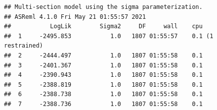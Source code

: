 \documentclass[
  12pt,
]{book}
\newenvironment{Shaded}{\begin{snugshade}}{\end{snugshade}}
\newcommand{\AttributeTok}[1]{\textcolor[rgb]{0.77,0.63,0.00}{#1}}
\newcommand{\DecValTok}[1]{\textcolor[rgb]{0.00,0.00,0.81}{#1}}
\newcommand{\FloatTok}[1]{\textcolor[rgb]{0.00,0.00,0.81}{#1}}
\newcommand{\FunctionTok}[1]{\textcolor[rgb]{0.00,0.00,0.00}{#1}}
\newcommand{\NormalTok}[1]{#1}
\newcommand{\OtherTok}[1]{\textcolor[rgb]{0.56,0.35,0.01}{#1}}
\newcommand{\SpecialCharTok}[1]{\textcolor[rgb]{0.00,0.00,0.00}{#1}}
\newcommand{\StringTok}[1]{\textcolor[rgb]{0.31,0.60,0.02}{#1}}
\begin{document}
\begin{Shaded}
\end{Shaded}

\begin{verbatim}
## Multi-section model using the sigma parameterization.
## ASReml 4.1.0 Fri May 21 01:55:57 2021
##           LogLik        Sigma2     DF     wall    cpu
##  1     -2495.853           1.0   1807 01:55:57    0.1 (1 restrained)
##  2     -2444.497           1.0   1807 01:55:58    0.1
##  3     -2401.367           1.0   1807 01:55:58    0.1
##  4     -2390.943           1.0   1807 01:55:58    0.1
##  5     -2388.819           1.0   1807 01:55:58    0.1
##  6     -2388.738           1.0   1807 01:55:58    0.1
##  7     -2388.736           1.0   1807 01:55:58    0.1
\end{verbatim}
\end{document}
